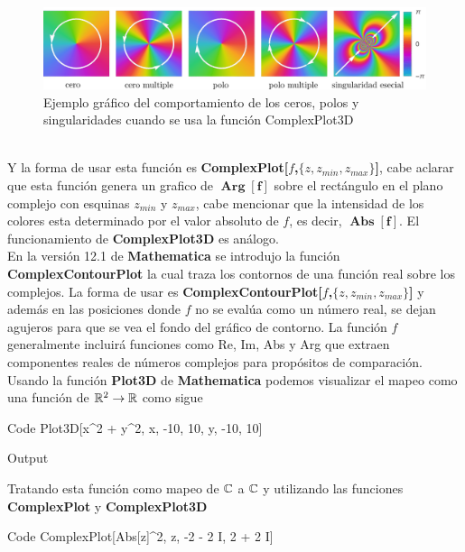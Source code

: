 \begin{figure}[h!]
	\centering
	\includegraphics[width=0.75\linewidth]{img/plotco}
	\caption{Ejemplo gráfico del comportamiento de los ceros, polos y singularidades cuando se usa la función ComplexPlot3D}
	\label{fig:plotco}
\end{figure}
\\Y la forma de usar esta función es \textbf{ComplexPlot[$f$,$\{z,z_{min},z_{max}\}$]}, cabe aclarar que esta función genera un grafico de $\mathbf{\operatorname{Arg}[f]}$ sobre el rectángulo en el plano complejo con esquinas $z_{min}$ y $z_{max}$, cabe mencionar que la intensidad de los colores esta determinado por el valor absoluto de $f$, es decir,  $\mathbf{\operatorname{Abs}[f]}$. El funcionamiento de \textbf{ComplexPlot3D}  es análogo.\\
En la versión 12.1 de \textbf{Mathematica} se introdujo la función \textbf{ComplexContourPlot} la cual traza los contornos de una función real sobre los complejos. La forma de usar es \textbf{ComplexContourPlot[$f$,$\{z,z_{min},z_{max}\}$]} y además en las posiciones donde $f$ no se evalúa como un número real, se dejan agujeros para que se vea el fondo del gráfico de contorno. La función $f$ generalmente incluirá funciones como Re, Im, Abs y Arg que extraen componentes reales de números complejos para propósitos de comparación.\\
Usando la función \textbf{Plot3D} de \textbf{Mathematica} podemos visualizar el mapeo como una función de $\mathbb{R}^2 \rightarrow \mathbb{R}$ como sigue
\begin{mmaCell}[functionlocal=y]{Code}
	  Plot3D[x^2 + y^2, {x, -10, 10}, {y, -10, 10}]
\end{mmaCell}

\begin{mmaCell}[moregraphics={moreig={scale=.4}}]{Output}
\end{mmaCell}

Tratando esta función como mapeo de $\mathbb{C}$ a $\mathbb{C}$ y utilizando las funciones \textbf{ComplexPlot} y \textbf{ComplexPlot3D}

\begin{mmaCell}[functionlocal=y]{Code}
	 ComplexPlot[Abs[z]^2, {z, -2 - 2 I, 2 + 2 I}]
\end{mmaCell}

